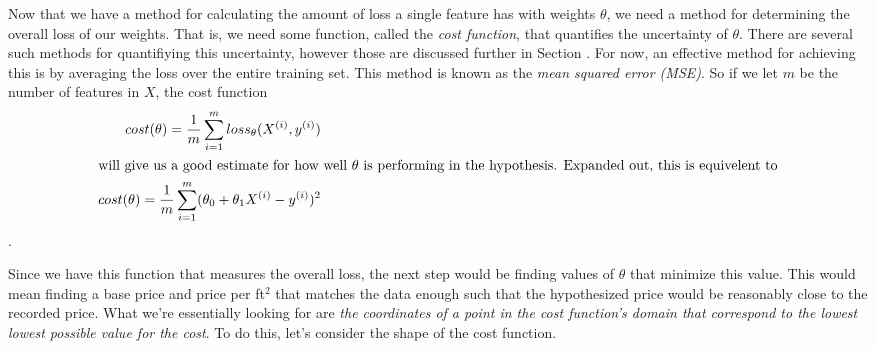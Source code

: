Now that we have a method for calculating the amount of loss a single feature
has with weights $\theta$, we need a method for determining the overall loss of
our weights. That is, we need some function, called the \emph{cost function},
that quantifies the uncertainty of $\theta$. There are several such methods for
quantifiying this uncertainty, however those are discussed further in Section
\placeholder. For now, an effective method for achieving this is by averaging
the loss over the entire training set. This method is known as the \emph{mean
squared error (MSE)}. So if we let $m$ be the number of features in $X$, the
cost function
\begin{subequations}
    \begin{align}
        cost(\theta) = \frac{1}{m}\sum_{i=1}^m loss_{\theta}(X^{(i)}, y^{(i)}) \\
    \intertext{will give us a good estimate for how well $\theta$ is performing
        in the hypothesis. Expanded out, this is equivelent to}
        cost(\theta) = \frac{1}{m}\sum_{i=1}^m (\theta_0 + \theta_1X^{(i)} -
        y^{(i)})^2
    \end{align}
\end{subequations}
.

Since we have this function that measures the overall loss, the next step would
be finding values of $\theta$ that minimize this value. This would mean finding
a base price and price per ft$^2$ that matches the data enough such that the
hypothesized price would be reasonably close to the recorded price. What we're
essentially looking for are \emph{the coordinates of a point in the cost
function's domain that correspond to the lowest lowest possible value for the
cost}. To do this, let's consider the shape of the cost function.

\begin{figure}[t!]
    \centering
    \caption{}
    \label{fg:cost}
\end{figure}

